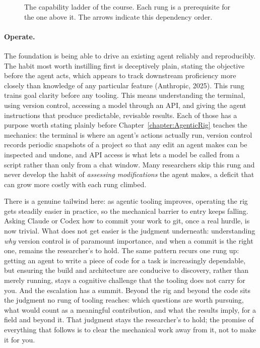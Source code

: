 \begin{figure}[htb!]
\begin{center}

\caption{The capability ladder of the course.
Each rung is a prerequisite for the one above it.
The arrows indicate this dependency order.}
\label{figure:CapabilityLadder}
\end{center}
\end{figure}

\paragraph{Operate.}
The foundation is being able to drive an existing agent reliably and reproducibly.
The habit most worth instilling first is deceptively plain, stating the objective before the agent acts, which appears to track downstream proficiency more closely than knowledge of any particular feature (Anthropic, 2025).
This rung trains goal clarity before any tooling.
This means understanding the terminal, using version control, accessing a model through an API, and giving the agent instructions that produce predictable, revisable results.
Each of those has a purpose worth stating plainly before Chapter~\ref{chapter:AgenticRig} teaches the mechanics: the terminal is where an agent's actions actually run, version control records periodic snapshots of a project so that any edit an agent makes can be inspected and undone, and API access is what lets a model be called from a script rather than only from a chat window.
Many researchers skip this rung and never develop the habit of \emph{assessing modifications} the agent makes, a deficit that can grow more costly with each rung climbed.

There is a genuine tailwind here: as agentic tooling improves, operating the rig gets steadily easier in practice, so the mechanical barrier to entry keeps falling.
Asking Claude or Codex how to commit your work to git, once a real hurdle, is now trivial.
What does not get easier is the judgment underneath: understanding \emph{why} version control is of paramount importance, and when a commit is the right one, remains the researcher's to hold.
The same pattern recurs one rung up: getting an agent to write a piece of code for a task is increasingly dependable, but ensuring the build and architecture are conducive to discovery, rather than merely running, stays a cognitive challenge that the tooling does not carry for you.
And the escalation has a summit.
Beyond the rig and beyond the code sits the judgment no rung of tooling reaches: which questions are worth pursuing, what would count as a meaningful contribution, and what the results imply, for a field and beyond it.
That judgment stays the researcher's to hold; the promise of everything that follows is to clear the mechanical work away from it, not to make it for you.

